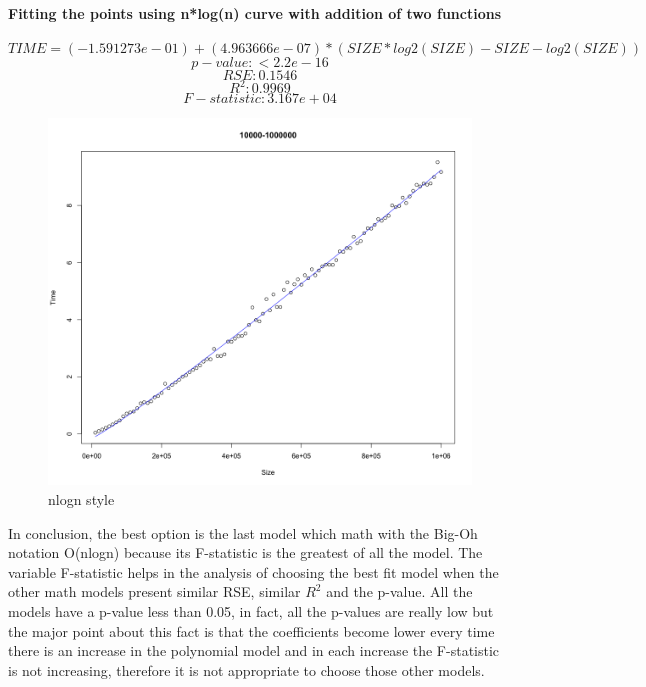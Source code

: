 \documentclass[14pt, oneside]{article}
\begin{document}
\paragraph{Fitting the points using n*log(n) curve with addition of two functions}

$$ TIME =  (-1.591273e-01 ) + (4.963666e-07)*(SIZE*log2(SIZE) - SIZE - log2(SIZE))$$
$$ p-value: < 2.2e-16 $$
$$ RSE: 0.1546$$
$$ R^{2}:  0.9969$$
$$ F-statistic: 3.167e+04$$

\begin{figure}[H]
\centering
\includegraphics[width=\linewidth]{Rplot10.png}
\caption{nlogn style}
\end{figure}

In conclusion, the best option is the last model which math with the Big-Oh notation O(nlogn) because its F-statistic is the greatest of all the model. The variable F-statistic helps in the analysis of choosing the best fit model
when the other math models present similar RSE, similar $R^{2}$ and the p-value. All the models have a p-value less than 0.05, in fact, all the p-values are really low but the major point about this fact is that the coefficients
become lower every time there is an increase in the polynomial model and in each increase the F-statistic is not increasing, therefore it is not appropriate to choose those other models.
\end{document}
